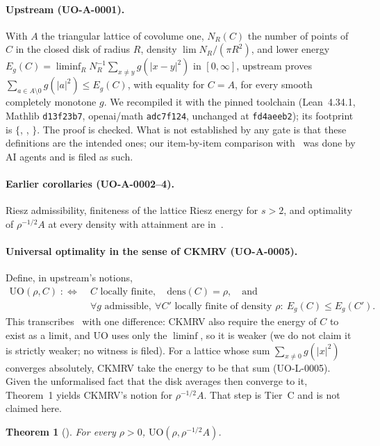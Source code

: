 \documentclass[11pt]{article}
\newtheorem{theorem}{Theorem}
\begin{document}
\paragraph{Upstream (UO-A-0001).} With $A$ the triangular lattice of covolume one, $N_R(C)$ the number of points of $C$
in the closed disk of radius $R$, density $\lim N_R/(\pi R^2)$, and lower energy
$E_g(C)=\liminf_R N_R^{-1}\sum_{x\ne y}g(|x-y|^2)$ in $[0,\infty]$, upstream proves
$\sum_{a\in A\setminus0}g(|a|^2)\le E_g(C)$, with equality for $C=A$, for every smooth completely monotone $g$. We
recompiled it with the pinned toolchain (Lean~4.34.1, Mathlib \texttt{d13f23b7}, openai/math \texttt{adc7f124},
unchanged at \texttt{fd4aeeb2}); its footprint is $\{$, , $\}$. The
proof is checked. What is not established by any gate is that these definitions are the intended ones; our item-by-item
comparison with~\cite[Defs.~1.1--1.3]{ckmrv} was done by AI agents and is filed as such.

\paragraph{Earlier corollaries (UO-A-0002--4).} Riesz admissibility, finiteness of the lattice Riesz energy for $s>2$,
and optimality of $\rho^{-1/2}A$ at every density with attainment are in~\cite{d12}.

\paragraph{Universal optimality in the sense of CKMRV (UO-A-0005).} Define, in upstream's notions,
\begin{align*}
\mathrm{UO}(\rho,C)\;:\iff\;& C \text{ locally finite},\quad \mathrm{dens}(C)=\rho,\quad\text{and}\\
& \forall g \text{ admissible},\ \forall C' \text{ locally finite of density } \rho:\ E_g(C)\le E_g(C').
\end{align*}
This transcribes~\cite[Def.~1.3]{ckmrv} with one difference: CKMRV also require the energy of $C$ to exist as a limit,
and $\mathrm{UO}$ uses only the $\liminf$, so it is weaker (we do not claim it is strictly weaker; no witness is
filed). For a lattice whose sum $\sum_{x\ne0}g(|x|^2)$ converges absolutely, CKMRV take the energy to be that sum
(UO-L-0005). Given the unformalised fact that the disk averages then converge to it, Theorem~1 yields CKMRV's notion
for $\rho^{-1/2}A$. That step is Tier~C and is not claimed here.
\begin{theorem}[]
For every $\rho>0$, $\mathrm{UO}(\rho,\rho^{-1/2}A)$.
\end{theorem}
\end{document}
